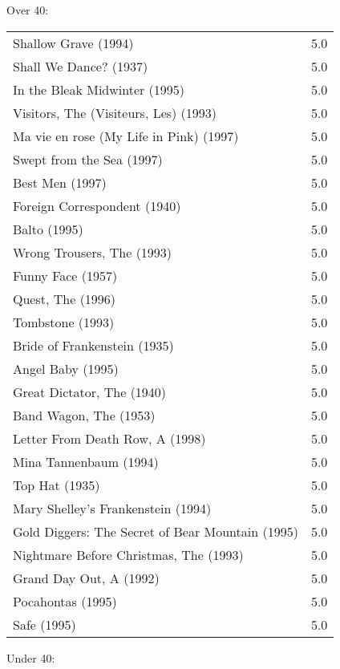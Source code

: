 \documentclass{article}
\begin{document}
Over 40:\\
\begin{tabular}{ l r }
Shallow Grave (1994)  & 5.0 \\
Shall We Dance? (1937)  & 5.0 \\
In the Bleak Midwinter (1995)  & 5.0 \\
Visitors, The (Visiteurs, Les) (1993)  & 5.0 \\
Ma vie en rose (My Life in Pink) (1997)  & 5.0 \\
Swept from the Sea (1997)  & 5.0 \\
Best Men (1997)  & 5.0 \\
Foreign Correspondent (1940)  & 5.0 \\
Balto (1995)  & 5.0 \\
Wrong Trousers, The (1993)  & 5.0 \\
Funny Face (1957)  & 5.0 \\
Quest, The (1996)  & 5.0 \\
Tombstone (1993)  & 5.0 \\
Bride of Frankenstein (1935)  & 5.0 \\
Angel Baby (1995)  & 5.0 \\
Great Dictator, The (1940)  & 5.0 \\
Band Wagon, The (1953)  & 5.0 \\
Letter From Death Row, A (1998)  & 5.0 \\
Mina Tannenbaum (1994)  & 5.0 \\
Top Hat (1935)  & 5.0 \\
Mary Shelley's Frankenstein (1994)  & 5.0 \\
Gold Diggers: The Secret of Bear Mountain (1995)  & 5.0 \\
Nightmare Before Christmas, The (1993)  & 5.0 \\
Grand Day Out, A (1992)  & 5.0 \\
Pocahontas (1995)  & 5.0 \\
Safe (1995)  & 5.0 \\
\end{tabular}
\newpage
Under 40:\\
\end{document}
